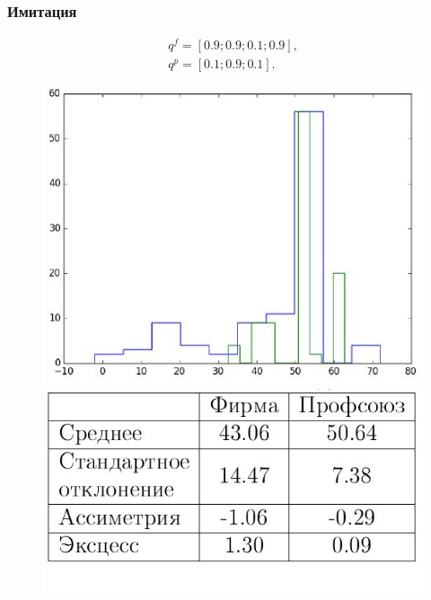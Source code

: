 \documentclass {beamer}
\begin{document}
\begin{frame}
	\frametitle{Имитация}
 \begin{gather*}
 q^f = \left[ 0.9; 0.9; 0.1; 0.9 \right], \\
 q^p = \left[ 0.1; 0.9; 0.1 \right].
 \end{gather*}
	\begin{figure}
		\begin{minipage}[b]{0.45\textwidth}
			
			\includegraphics[width=\textwidth]{firm3}
		\end{minipage}
		\begin{minipage}[b]{0.45\textwidth}
			
			\includegraphics[width=\textwidth]{firmtable3}
		\end{minipage}
		
	\end{figure}
\end{frame}
\end{document}
